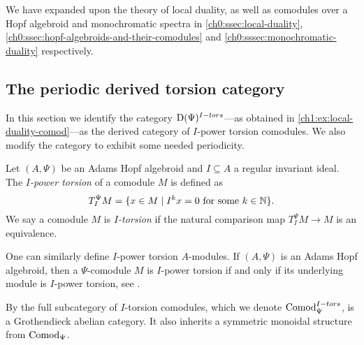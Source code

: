 \begin{addendum}
    We have expanded upon the theory of local duality, as well as comodules over a Hopf algebroid and monochromatic spectra in \cref{ch0:ssec:local-duality}, \cref{ch0:ssec:hopf-algebroids-and-their-comodules} and \cref{ch0:sssec:monochromatic-duality} respectively. 
\end{addendum}

















\subsection{The periodic derived torsion category}
\label{ch1:ssec:the-algebraic-model}

In this section we identify the category $\mathrm{D}(\Psi)^{I-tors}$---as obtained in \cref{ch1:ex:local-duality-comod}---as the derived category of $I$-power torsion comodules. We also modify the category to exhibit some needed periodicity. 

\begin{definition}
    \label{ch1:def:I-power-torsion-comodule}
    Let $(A,\Psi)$ be an Adams Hopf algebroid and $I\subseteq A$ a regular invariant ideal. The\emph{ $I$-power torsion} of a comodule $M$ is defined as 
    $$T_I^\Psi M = \{x\in M \mid I^kx = 0 \text{ for some } k\in \mathbb{N}\}.$$
    We say a comodule $M$ is \emph{$I$-torsion} if the natural comparison map $T_I^\Psi M\longrightarrow M$ is an equivalence. 
\end{definition}

\begin{remark}
    \label{ch1:rm:torsion-iff-underlying-is-torsion}
    One can similarly define $I$-power torsion $A$-modules. If $(A,\Psi)$ is an Adams Hopf algebroid, then a $\Psi$-comodule $M$ is $I$-power torsion if and only if its underlying module is $I$-power torsion, see \cite[5.7]{barthel-heard-valenzuela_2018}. 
\end{remark}

\begin{remark}
    \label{ch1:rm:torsion-comodules-grothendieck-monoidal}
    By \cite[5.10]{barthel-heard-valenzuela_2018} the full subcategory of $I$-torsion comodules, which we denote $\mathrm{Comod}_\Psi^{I-tors}$, is a Grothendieck abelian category. It also inherits a symmetric monoidal structure from $\mathrm{Comod}_\Psi$. 
\end{remark}

